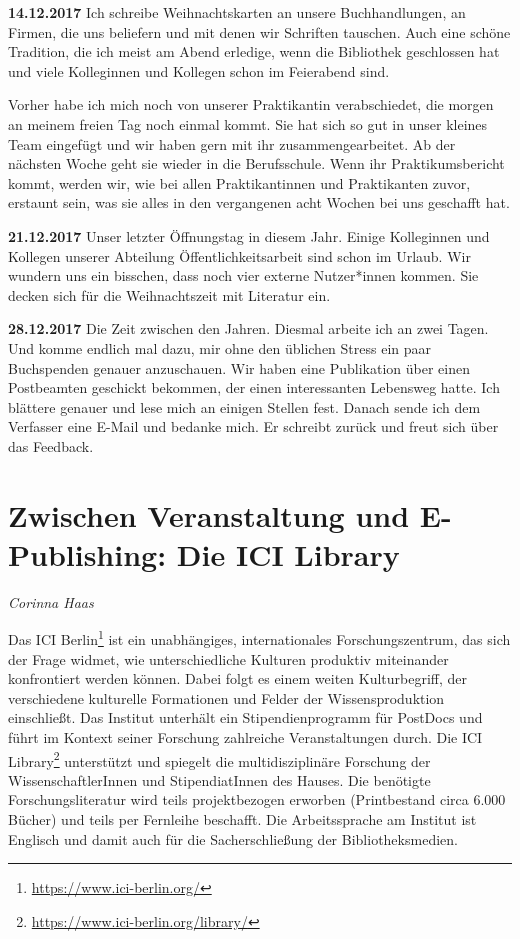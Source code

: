 \documentclass[a4paper,
fontsize=11pt,
oneside,
numbers=noperiodatend,
parskip=half-,
bibliography=totoc,
final
]{scrartcl}
\begin{document}
\textbf{14.12.2017} Ich schreibe Weihnachtskarten an unsere
Buchhandlungen, an Firmen, die uns beliefern und mit denen wir Schriften
tauschen. Auch eine schöne Tradition, die ich meist am Abend erledige,
wenn die Bibliothek geschlossen hat und viele Kolleginnen und Kollegen
schon im Feierabend sind.

Vorher habe ich mich noch von unserer Praktikantin verabschiedet, die
morgen an meinem freien Tag noch einmal kommt. Sie hat sich so gut in
unser kleines Team eingefügt und wir haben gern mit ihr
zusammengearbeitet. Ab der nächsten Woche geht sie wieder in die
Berufsschule. Wenn ihr Praktikumsbericht kommt, werden wir, wie bei
allen Praktikantinnen und Praktikanten zuvor, erstaunt sein, was sie
alles in den vergangenen acht Wochen bei uns geschafft hat.

\textbf{21.12.2017} Unser letzter Öffnungstag in diesem Jahr. Einige
Kolleginnen und Kollegen unserer Abteilung Öffentlichkeitsarbeit sind
schon im Urlaub. Wir wundern uns ein bisschen, dass noch vier externe
Nutzer*innen kommen. Sie decken sich für die Weihnachtszeit mit
Literatur ein.

\textbf{28.12.2017} Die Zeit zwischen den Jahren. Diesmal arbeite ich an
zwei Tagen. Und komme endlich mal dazu, mir ohne den üblichen Stress ein
paar Buchspenden genauer anzuschauen. Wir haben eine Publikation über
einen Postbeamten geschickt bekommen, der einen interessanten Lebensweg
hatte. Ich blättere genauer und lese mich an einigen Stellen fest.
Danach sende ich dem Verfasser eine E-Mail und bedanke mich. Er schreibt
zurück und freut sich über das Feedback.

\hypertarget{zwischen-veranstaltung-und-e-publishing-die-ici-library}{%
\section{Zwischen Veranstaltung und E-Publishing: Die ICI
Library}\label{zwischen-veranstaltung-und-e-publishing-die-ici-library}}

\emph{Corinna Haas}

Das ICI Berlin\footnote{\url{https://www.ici-berlin.org/}} ist ein
unabhängiges, internationales Forschungszentrum, das sich der Frage
widmet, wie unterschiedliche Kulturen produktiv miteinander konfrontiert
werden können. Dabei folgt es einem weiten Kulturbegriff, der
verschiedene kulturelle Formationen und Felder der Wissensproduktion
einschließt. Das Institut unterhält ein Stipendienprogramm für PostDocs
und führt im Kontext seiner Forschung zahlreiche Veranstaltungen durch.
Die ICI Library\footnote{\url{https://www.ici-berlin.org/library/}}
unterstützt und spiegelt die multidisziplinäre Forschung der
WissenschaftlerInnen und StipendiatInnen des Hauses. Die benötigte
Forschungsliteratur wird teils projektbezogen erworben (Printbestand
circa 6.000 Bücher) und teils per Fernleihe beschafft. Die
Arbeitssprache am Institut ist Englisch und damit auch für die
Sacherschließung der Bibliotheksmedien.
\end{document}
